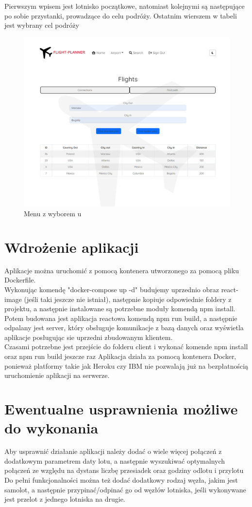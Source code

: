 \documentclass[12pt]{article}
\begin{document}
Pierwszym wpisem jest lotnisko początkowe, natomiast kolejnymi są następujące po sobie przystanki, prowadzące do celu podróży.
Ostatnim wierszem w tabeli jest wybrany cel podróży
\begin{figure}[!ht]
    \centering
    \includegraphics[width=0.55\linewidth]{8}  
    \caption{Menu z wyborem u}
\end{figure}
\newpage
\section{Wdrożenie aplikacji}
Aplikacje można uruchomić z pomocą kontenera utworzonego za pomocą pliku Dockerfile.\\
Wykonując komendę "docker-compose up -d" budujemy uprzednio obraz react-image (jeśli taki jeszcze nie istniał), następnie
kopiuje odpowiednie foldery z projektu, a następnie instalowane są potrzebne moduły komendą npm install. Potem budowana jest aplikacja reactowa komendą npm run build, a następnie odpalany jest server, który obsługuje komunikacje z bazą danych oraz wyświetla aplikacje posługując sie uprzedni zbudowanym klientem.\\
Czasami potrzebne jest przejście do folderu client i wykonać komende npm install oraz npm run build jeszcze raz
Aplikacja działa za pomocą kontenera Docker, ponieważ platformy takie jak Heroku czy IBM nie pozwalają już na bezpłatnością uruchomienie aplikacji na serwerze.

\section{Ewentualne usprawnienia możliwe do wykonania}
Aby usprawnić działanie aplikacji należy dodać o wiele więcej połączeń z dodatkowym parametrem daty lotu, a następnie wyszukiwać optymalnych połączeń ze względu na dystans liczbę przesiadek oraz godziny odlotu i przylotu\\
Do pełni funkcjonalności można też dodać dodatkowy rodzaj węzła, jakim jest samolot, a następnie przypinać/odpinać go od węzłów lotniska, jeśli wykonywane jest przelot z jednego lotniska na drugie.
\end{document}
